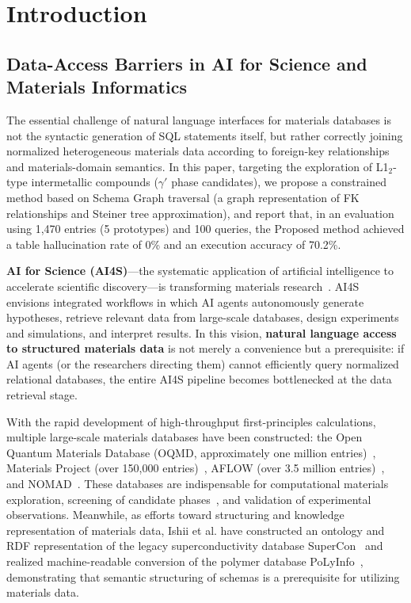 \documentclass[5p,twocolumn]{elsarticle}
\begin{document}
\section{Introduction}
\label{sec:introduction}

\subsection{Data-Access Barriers in AI for Science and Materials Informatics}

The essential challenge of natural language interfaces for materials databases is
not the syntactic generation of SQL statements itself, but rather
correctly joining normalized heterogeneous materials data according to foreign-key relationships and materials-domain semantics.
In this paper, targeting the exploration of L1$_2$-type intermetallic compounds ($\gamma'$ phase candidates),
we propose a constrained method based on Schema Graph traversal
(a graph representation of FK relationships and Steiner tree approximation), and report that,
in an evaluation using 1{,}470 entries (5 prototypes) and 100 queries,
the Proposed method achieved a table hallucination rate of 0\% and an execution accuracy of 70.2\%.

\textbf{AI for Science (AI4S)}---the systematic application of artificial intelligence to accelerate scientific discovery---is
transforming materials research~\citep{wang2023ai4s,himanen2019dscribe}.
AI4S envisions integrated workflows in which AI agents autonomously generate hypotheses, retrieve relevant data from large-scale databases,
design experiments and simulations, and interpret results.
In this vision, \textbf{natural language access to structured materials data} is
not merely a convenience but a prerequisite:
if AI agents (or the researchers directing them) cannot efficiently query normalized relational databases,
the entire AI4S pipeline becomes bottlenecked at the data retrieval stage.

With the rapid development of high-throughput first-principles calculations,
multiple large-scale materials databases have been constructed:
the Open Quantum Materials Database (OQMD, approximately one million entries)~\citep{saal2013oqmd,kirklin2015oqmd},
Materials Project (over 150,000 entries)~\citep{jain2013mp},
AFLOW (over 3.5 million entries)~\citep{curtarolo2012aflow},
and NOMAD~\citep{draxl2019nomad}.
These databases are indispensable for computational materials exploration, screening of candidate phases~\citep{senkov2018hea,george2019hea},
and validation of experimental observations.
Meanwhile, as efforts toward structuring and knowledge representation of materials data,
Ishii et al. have constructed an ontology and RDF representation of the legacy superconductivity database SuperCon~\cite{ishii2023supercon} and
realized machine-readable conversion of the polymer database PoLyInfo~\cite{ishii2024polyinfo},
demonstrating that semantic structuring of schemas is a prerequisite for utilizing materials data.
\end{document}
